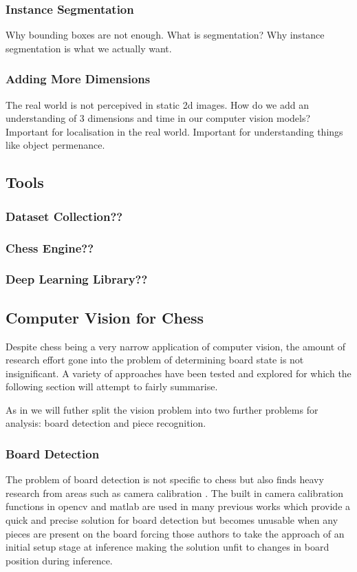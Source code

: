 \subsubsection{Instance Segmentation}
Why bounding boxes are not enough.  What is segmentation? Why instance segmentation is what we actually want. \cite{}
\subsubsection{Adding More Dimensions}
The real world is not percepived in static 2d images.  How do we add an understanding of 3 dimensions and time in our computer vision models? \cite{}
Important for localisation in the real world.  Important for understanding things like object permenance.

\subsection{Tools}
\subsubsection{Dataset Collection??}
\subsubsection{Chess Engine??}
\subsubsection{Deep Learning Library??}

\subsection{Computer Vision for Chess}
Despite chess being a very narrow application of computer vision, the amount of research effort gone into the problem of determining 
board state is not insignificant. 
A variety of approaches have been tested and explored for which the following section will attempt to fairly summarise.

As in \cite{} we will futher split the vision problem into two further problems for analysis: board detection and piece recognition.

\subsubsection{Board Detection}
The problem of board detection is not specific to chess but also finds heavy research from areas such as camera calibration \cite{}. 
The built in camera calibration functions in opencv \cite{} and matlab \cite{} are used in many previous works \cite{} which 
provide a quick  and precise solution for board detection but becomes unusable when any pieces are present on the board forcing those authors to 
take the approach of an initial setup stage at inference making the solution unfit to changes in board position during inference. 


